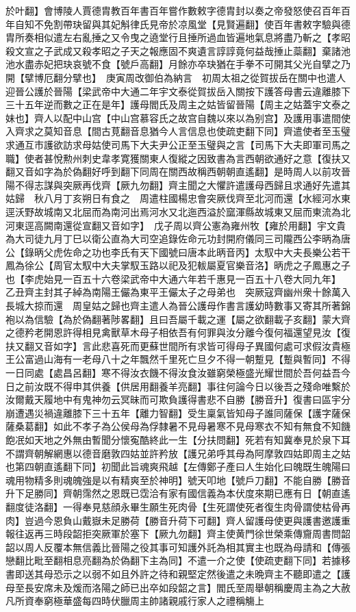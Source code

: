 於叶翻】會博陵人賈德胄教百年書百年嘗作數敕字德胄封以奏之帝發怒使召百年百年自知不免割帶玦留與其妃斛律氏見帝於凉風堂【見賢遍翻】使百年書敕字驗與德胄所奏相似遣左右亂捶之又令曳之遶堂行且捶所過血皆遍地氣息將盡乃斬之【孝昭殺文宣之子武成又殺孝昭之子天之報應固不爽遺言諄諄竟何益哉捶止蘂翻】棄諸池池水盡赤妃把玦哀號不食【號戶高翻】月餘亦卒玦猶在手拳不可開其父光自擘之乃開【擘博厄翻分擘也】　庚寅周改御伯為納言　初周太祖之從賀拔岳在關中也遣人迎晉公護於晉陽【梁武帝中大通二年宇文泰從賀拔岳入關按下護答母書云違離膝下三十五年逆而數之正在是年】護母閻氏及周主之姑皆留晉陽【周主之姑蓋宇文泰之妹也】齊人以配中山宫【中山宫慕容氏之故宫自魏以來以為别宫】及護用事遣間使入齊求之莫知音息【間古莧翻音息猶今人言信息也使疏吏翻下同】齊遣使者至玉璧求通互市護欲訪求母姑使司馬下大夫尹公正至玉璧與之言【司馬下大夫即軍司馬之職】使者甚悅勲州刺史韋孝寛獲關東人復縱之因致書為言西朝欲通好之意【復扶又翻又音如字為於偽翻好呼到翻下同周在關西故稱西朝朝直遙翻】是時周人以前攻晉陽不得志謀與突厥再伐齊【厥九勿翻】齊主聞之大懼許遣護母西歸且求通好先遣其姑歸　秋八月丁亥朔日有食之　周遣柱國楊忠會突厥伐齊至北河而還【水經河水東逕沃野故城南又北屈而為南河出焉河水又北迤西溢於窳渾縣故城東又屈而東流為北河東逕高闕南還從宣翻又音如字】　戊子周以齊公憲為雍州牧【雍於用翻】宇文貴為大司徒九月丁巳以衛公直為大司空追錄佐命元功封開府儀同三司隴西公李昞為唐公【錄昞父虎佐命之功也李氏有天下國號曰唐本此昞音丙】太馭中大夫長樂公若干鳳為徐公【周官太馭中大夫掌馭玉路以祀及犯軷屬夏官樂音洛】昞虎之子鳳惠之子也【李虎始見一百五十六卷梁武帝中大通六年若千惠見一百五十八卷大同九年】　乙丑齊主封其子綽為南陽王儼為東平王儼太子之母弟也　突厥寇齊幽州衆十餘萬入長城大掠而還　周皇姑之歸也齊主遣人為晉公護母作書言護幼時數事又寄其所著錦袍以為信驗【為於偽翻著陟畧翻】且曰吾屬千載之運【屬之欲翻載子亥翻】蒙大齊之德矜老開恩許得相見禽獸草木母子相依吾有何罪與汝分離今復何福還望見汝【復扶又翻又音如字】言此悲喜死而更蘇世間所有求皆可得母子異國何處可求假汝貴極王公富過山海有一老母八十之年飄然千里死亡旦夕不得一朝蹔見【蹔與暫同】不得一日同處【處昌呂翻】寒不得汝衣饑不得汝食汝雖窮榮極盛光耀世間於吾何益吾今日之前汝既不得申其供養【供居用翻養羊亮翻】事往何論今日以後吾之殘命唯繫於汝爾戴天履地中有鬼神勿云冥昧而可欺負護得書悲不自勝【勝音升】復書曰區宇分崩遭遇災禍違離膝下三十五年【離力智翻】受生稟氣皆知母子誰同薩保【護字薩保薩桑葛翻】如此不孝子為公侯母為俘隸暑不見母暑寒不見母寒衣不知有無食不知饑飽冺如天地之外無由暫聞分懷寃酷終此一生【分扶問翻】死若有知冀奉見於泉下耳不謂齊朝解網惠以德音磨敦四姑並許矜放【護兄弟呼其母為阿摩敦四姑即周主之姑也第四朝直遙翻下同】初聞此旨魂爽飛越【左傳鄭子產曰人生始化曰魄既生魄陽曰魂用物精多則魂魄強是以有精爽至於神明】號天叩地【號戶刀翻】不能自勝【勝音升下足勝同】齊朝霈然之恩既已霑洽有家有國信義為本伏度來期已應有日【朝直遙翻度徒洛翻】一得奉見慈顔永畢生願生死肉骨【生死謂使死者復生肉骨謂使枯骨再肉】豈過今恩負山戴嶽未足勝荷【勝音升荷下可翻】齊人留護母使更與護書邀護重報往返再三時段韶拒突厥軍於塞下【厥九勿翻】齊主使黄門徐世榮乘傳齎周書問韶韶以周人反覆本無信義比晉陽之役其事可知護外託為相其實主也既為母請和【傳張戀翻比毗至翻相息亮翻為於偽翻下主為同】不遣一介之使【使疏吏翻下同】若據移書即送其母恐示之以弱不如且外許之待和親堅定然後遣之未晩齊主不聽即遣之【護母至長安席未及煖而洛陽之師已出卒如段韶之言】閻氏至周舉朝稱慶周主為之大赦凡所資奉窮極華盛每四時伏臘周主帥諸親戚行家人之禮稱觴上
